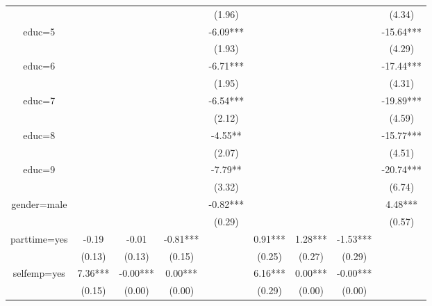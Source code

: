 \documentclass[12pt,notitlepage,onecolumn,aps,pra]{article}
\begin{document}
\begin{table}[ht]
\begin{adjustbox}{width={0.9\textwidth},totalheight={\textheight}}
\begin{threeparttable}
\begin{tabular}{ccccccccc}
             &          &           &            &      (1.96) &           &            &             &       (4.34) \\
educ=5       &          &           &            &    -6.09*** &           &            &             &    -15.64*** \\
             &          &           &            &      (1.93) &           &            &             &       (4.29) \\
educ=6       &          &           &            &    -6.71*** &           &            &             &    -17.44*** \\
             &          &           &            &      (1.95) &           &            &             &       (4.31) \\
educ=7       &          &           &            &    -6.54*** &           &            &             &    -19.89*** \\
             &          &           &            &      (2.12) &           &            &             &       (4.59) \\
educ=8       &          &           &            &     -4.55** &           &            &             &    -15.77*** \\
             &          &           &            &      (2.07) &           &            &             &       (4.51) \\
educ=9       &          &           &            &     -7.79** &           &            &             &    -20.74*** \\
             &          &           &            &      (3.32) &           &            &             &       (6.74) \\
gender=male  &          &           &            &    -0.82*** &           &            &             &      4.48*** \\
             &          &           &            &      (0.29) &           &            &             &       (0.57) \\
parttime=yes &    -0.19 &     -0.01 &   -0.81*** &             &   0.91*** &    1.28*** &    -1.53*** &              \\
             &   (0.13) &    (0.13) &     (0.15) &             &    (0.25) &     (0.27) &      (0.29) &              \\
selfemp=yes  &  7.36*** &  -0.00*** &    0.00*** &             &   6.16*** &    0.00*** &    -0.00*** &              \\
             &   (0.15) &    (0.00) &     (0.00) &             &    (0.29) &     (0.00) &      (0.00) &              \\

\end{tabular}
\end{threeparttable}
\end{adjustbox}
\end{table}
\end{document}
